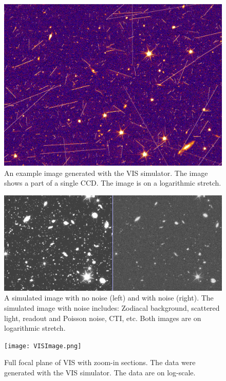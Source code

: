 \documentclass[a4paper,11pt,english]{sphinxmanual}
\begin{document}
\begin{figure}[htbp]
\centering
\capstart

\includegraphics{VISpartOfCCDlogscale.png}
\caption{An example image generated with the VIS simulator. The image shows a part of a single
CCD. The image is on a logarithmic stretch.}\end{figure}
\begin{figure}[htbp]
\centering
\capstart

\includegraphics{noisecomparison.png}
\caption{A simulated image with no noise (left) and with noise (right). The simulated image with noise
includes: Zodiacal background, scattered light, readout and Poisson noise, CTI, etc. Both images
are on logarithmic stretch.}\end{figure}
\begin{figure}[htbp]
\centering
\capstart

\texttt{[image: VISImage.png]}
\caption{Full focal plane of VIS with zoom-in sections. The data were generated with the VIS simulator. The data
are on log-scale.}\end{figure}
\end{document}
